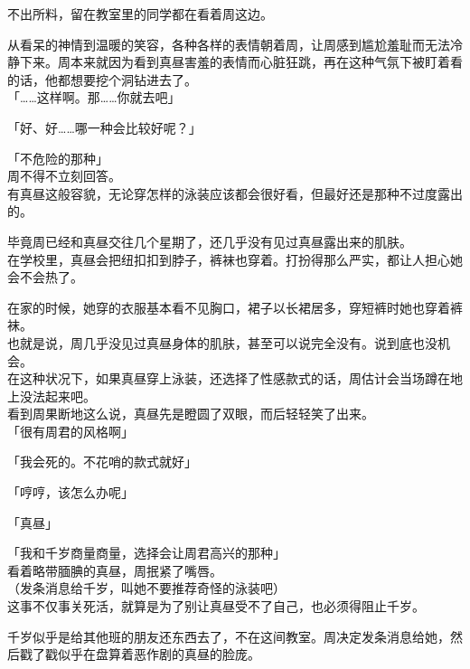 不出所料，留在教室里的同学都在看着周这边。

从看呆的神情到温暖的笑容，各种各样的表情朝着周，让周感到尴尬羞耻而无法冷静下来。周本来就因为看到真昼害羞的表情而心脏狂跳，再在这种气氛下被盯着看的话，他都想要挖个洞钻进去了。\\

「……这样啊。那……你就去吧」

「好、好……哪一种会比较好呢？」

「不危险的那种」\\

周不得不立刻回答。\\

有真昼这般容貌，无论穿怎样的泳装应该都会很好看，但最好还是那种不过度露出的。

毕竟周已经和真昼交往几个星期了，还几乎没有见过真昼露出来的肌肤。\\

在学校里，真昼会把纽扣扣到脖子，裤袜也穿着。打扮得那么严实，都让人担心她会不会热了。

在家的时候，她穿的衣服基本看不见胸口，裙子以长裙居多，穿短裤时她也穿着裤袜。\\

也就是说，周几乎没见过真昼身体的肌肤，甚至可以说完全没有。说到底也没机会。\\

在这种状况下，如果真昼穿上泳装，还选择了性感款式的话，周估计会当场蹲在地上没法起来吧。\\

看到周果断地这么说，真昼先是瞪圆了双眼，而后轻轻笑了出来。\\

「很有周君的风格啊」

「我会死的。不花哨的款式就好」

「哼哼，该怎么办呢」

「真昼」

「我和千岁商量商量，选择会让周君高兴的那种」\\

看着略带腼腆的真昼，周抿紧了嘴唇。\\

（发条消息给千岁，叫她不要推荐奇怪的泳装吧）\\

这事不仅事关死活，就算是为了别让真昼受不了自己，也必须得阻止千岁。

千岁似乎是给其他班的朋友还东西去了，不在这间教室。周决定发条消息给她，然后戳了戳似乎在盘算着恶作剧的真昼的脸庞。
